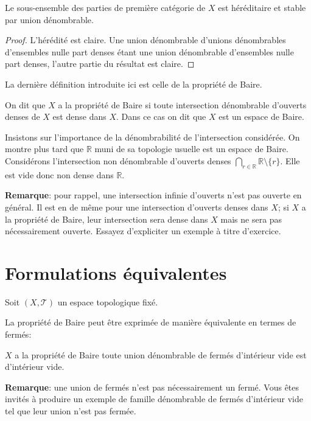 \begin{prop}
  Le sous-ensemble des parties de première catégorie de $X$ est héréditaire
  et stable par union dénombrable.
\end{prop}

\begin{proof}
  L'hérédité est claire. Une union dénombrable d'unions dénombrables d'ensembles
  nulle part denses étant une union dénombrable d'ensembles nulle part denses,
  l'autre partie du résultat est claire.
\end{proof}

La dernière définition introduite ici est celle de la propriété de Baire.
\begin{df}
  On dit que $X$ a la propriété de Baire si toute intersection dénombrable
  d'ouverts denses de $X$ est dense dans $X$. Dans ce cas on dit que $X$
  est un espace de Baire.
\end{df}

Insistons sur l'importance de la dénombrabilité de l'intersection considérée.
On montre plus
tard que $\mathbb{R}$ muni de sa topologie usuelle est un espace
de Baire. Considérons l'intersection non dénombrable d'ouverts denses
$\bigcap_{r\in\mathbb{R}}\mathbb{R}\setminus \{r\}$. Elle est vide
donc non dense dans $\mathbb{R}$.

\textbf{Remarque}: pour rappel, une intersection infinie d'ouverts n'est
pas ouverte en général. Il est en de même pour une intersection d'ouverts
denses dans $X$; si $X$ a la propriété de Baire, leur intersection
sera dense dans $X$ mais ne sera pas nécessairement ouverte.
Essayez d'expliciter un exemple à titre d'exercice.

\section{Formulations équivalentes}
Soit $(X, \mathcal{T})$ un espace topologique fixé.

La propriété de Baire peut être exprimée de manière équivalente
en termes de fermés:
\begin{prop}
  $X$ a la propriété de Baire \ssi{} toute union dénombrable de fermés
  d'intérieur vide est d'intérieur vide.
\end{prop}

\textbf{Remarque}: une union de fermés n'est pas nécessairement
un fermé. Vous êtes invités à produire un exemple de famille
dénombrable de fermés d'intérieur vide tel que leur union n'est
pas fermée.

